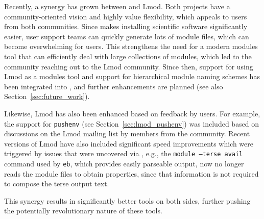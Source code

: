 Recently, a synergy has grown between \easybuild{} and Lmod. Both projects have a
community-oriented vision and highly value flexibility, which appeals to users
from both communities. Since \easybuild{} makes installing scientific software
significantly easier, user support teams can quickly generate lots of module
files, which can become overwhelming for users. This strengthens the need for a
modern modules tool that can efficiently deal with large collections of modules,
which led to the \easybuild{} community reaching out to the Lmod community.
Since then, support for using Lmod as a modules tool and support for hierarchical
module naming schemes has been integrated into \easybuild{}, and further
enhancements are planned (see also Section~\ref{sec:future_work}).

Likewise, Lmod has also been enhanced based on feedback by \easybuild{} users.
For example, the support for \texttt{pushenv} (see
Section~\ref{sec:lmod_pushenv}) was included based on discussions on the Lmod
mailing list by members from the \easybuild{} community. Recent versions of Lmod
have also included significant speed improvements which were triggered by issues
that were uncovered via \easybuild{}, e.g., the \texttt{module --terse avail}
command used by \texttt{eb}, which provides easily parseable output, now no longer
reads the module files to obtain properties, since that information is not
required to compose the terse output text.

This synergy results in significantly better tools on both sides, further
pushing the potentially revolutionary nature of these tools.
